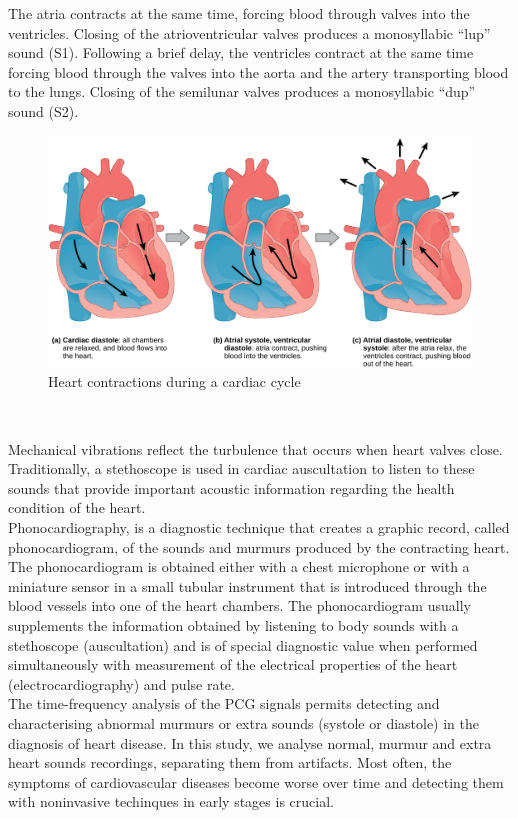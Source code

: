 \documentclass[11pt, a4papper]{report}
\theoremstyle{plain}
\theoremstyle{definition}
\theoremstyle{definition}
\theoremstyle{proposition}
\begin{document}
The atria contracts at the same time, forcing blood through valves into the ventricles. Closing of the atrioventricular valves produces a monosyllabic “lup” sound (S1). Following a brief delay, the ventricles contract at the same time forcing blood through the valves into the aorta and the artery transporting blood to the lungs. Closing of the semilunar valves produces a monosyllabic “dup” sound (S2).
\\

\begin{figure}[h]
\includegraphics[width=14cm]{heart.jpg}
\centering
\caption{Heart contractions during a cardiac cycle}
\end{figure}
\

Mechanical vibrations reflect the turbulence that occurs when heart valves close. Traditionally, a stethoscope is used in cardiac auscultation to listen to these sounds that provide important acoustic information regarding the health condition of the heart. 
\\

Phonocardiography, is a diagnostic technique that creates a graphic record, called phonocardiogram, of the sounds and murmurs produced by the contracting heart. The phonocardiogram is obtained either with a chest microphone or with a miniature sensor in a small tubular instrument that is introduced through the blood vessels into one of the heart chambers. The phonocardiogram usually supplements the information obtained by listening to body sounds with a stethoscope (auscultation) and is of special diagnostic value when performed simultaneously with measurement of the electrical properties of the heart (electrocardiography) and pulse rate.
\\

The time-frequency analysis of the PCG signals permits detecting and characterising abnormal murmurs or extra sounds (systole or diastole) in the diagnosis of heart disease. In this study, we analyse normal, murmur and extra heart sounds recordings, separating them from artifacts. Most often, the symptoms of cardiovascular diseases become worse over time and detecting them with noninvasive techinques in early stages is crucial.
\\
\end{document}
